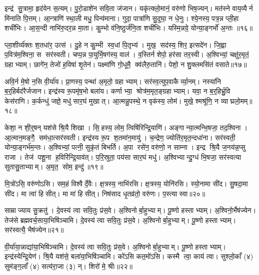 इन्द्र॑ सु॒त्रामा॒ हृद॑येन स॒त्यम्। पु॒रो॒डाशे॑न सवि॒ता ज॑जान। यकृ॑त्क्लो॒मानं॒ वरु॑णो भिष॒ज्यन्। मत॑स्ने वाय॒व्यैर्न मि॑नाति पि॒त्तम्। आ॒न्त्राणि॑ स्था॒ली मधु॒ पिन्व॑माना। गुदा॒ पात्रा॑णि सु॒दुघा॒ न धे॒नुः। श्ये॒नस्य॒ पत्र॒न्न प्ली॒हा शची॑भिः। आ॒स॒न्दी नाभि॑रु॒दर॒न्न मा॒ता। कु॒म्भो व॑नि॒ष्ठुर्ज॑नि॒ता शची॑भिः। यस्मि॒न्नग्रे॒ योन्या॒ङ्गर्भो॑ अ॒न्तः ॥१६॥

प्ला॒शीर्व्य॑क्तः श॒तधा॑र॒ उत्स॑। दु॒हे न कु॒म्भी स्व॒धां पि॒तृभ्य॑। मुख॒ सद॑स्य॒ शिर॒ इत्सदे॑न। जि॒ह्वा प॒वित्र॑म॒श्विना॒ स सर॑स्वती। चप्प॒न्न पा॒युर्भि॒षग॑स्य॒ वाल॑। व॒स्तिर्न शेपो॒ हर॑सा तर॒स्वी। अ॒श्विभ्यां॒ चक्षु॑र॒मृतं॒ ग्रहाभ्याम्। छागे॑न॒ तेजो॑ ह॒विषा॑ शृ॒तेन॑। पक्ष्मा॑णि गो॒धूमै॒ क्व॑लैरु॒तानि॑। पेशो॒ न शु॒क्लमसि॑तं वसाते॥१७॥

अवि॒र्न मे॒षो न॒सि वी॒र्या॑य। प्रा॒णस्य॒ पन्था॑ अ॒मृतो॒ ग्रहाभ्याम्। सर॑स्व॒त्युप॒वाकैर्व्या॒नम्। नस्या॑नि ब॒र्॒हिर्बद॑रैर्जजान। इन्द्र॑स्य रू॒पमृ॑ष॒भो बला॑य। कर्णाभ्या॒ श्रोत्र॑म॒मृत॒ङ्ग्रहाभ्याम्। यवा॒ न ब॒र्॒हिर्भ्रु॒वि केस॑राणि। क॒र्कन्धु॑ जज्ञे॒ मधु॑ सार॒घं मुखात्। आ॒त्मन्नु॒पस्थे॒ न वृक॑स्य॒ लोम॑। मुखे॒ श्मश्रू॑णि॒ न व्याघ्रलो॒मम्॥१८॥

केशा॒ न शी॒र्॒षन्‌ यश॑से श्रि॒यै शिखा। सि॒हस्य॒ लोम॒ त्विषि॑रिन्द्रि॒याणि॑। अङ्गान्या॒त्मन्भि॒षजा॒ तद॒श्विना। आ॒त्मान॒मङ्गै॒ सम॑धा॒त्सर॑स्वती। इन्द्र॑स्य रू॒प श॒तमा॑न॒मायु॑। च॒न्द्रेण॒ ज्योति॑र॒मृत॒न्दधा॑ना। सर॑स्वती॒ योन्या॒ङ्गर्भ॑म॒न्तः। अ॒श्विभ्यां॒ पत्नी॒ सुकृ॑तं बिभर्ति। अ॒पा रसे॑न॒ वरु॑णो॒ न साम्ना। इन्द्र श्रि॒यै ज॒नय॑न्न॒प्सु राजा। तेज॑ पशू॒ना ह॒विरि॑न्द्रि॒याव॑त्। प॒रि॒स्रुता॒ पय॑सा सार॒घं मधु॑। अ॒श्विभ्यान्दु॒ग्धं भि॒षजा॒ सर॑स्वत्या सुतासु॒ताभ्याम्। अ॒मृत॒ सोम॒ इन्दु॑॥१९॥\anuvakamend[अन्त॑र आ॒राद॒न्तर्व॑साते व्याघ्रलो॒म राजा॑ च॒त्वारि॑ च]

मि॒त्रो॑ऽसि॒ वरु॑णोऽसि। सम॒हं विश्वैर्दे॒वैः। क्ष॒त्रस्य॒ नाभि॑रसि। क्ष॒त्रस्य॒ योनि॑रसि। स्यो॒नामा सी॑द। सु॒षदा॒मा सी॑द। मा त्वा॑ हिसीत्। मा मा॑ हिसीत्। निष॑साद धृ॒तव्र॑तो॒ वरु॑णः। प॒स्त्यास्वा॥२०॥

साम्राज्याय सु॒क्रतु॑। दे॒वस्य॑ त्वा सवि॒तुः प्र॑स॒वे। अ॒श्विनोर्बा॒हुभ्याम्। पू॒ष्णो हस्ताभ्याम्। अ॒श्विनो॒र्भैष॑ज्येन। तेज॑से ब्रह्मवर्च॒साया॒भिषि॑ञ्चामि। दे॒वस्य॑ त्वा सवि॒तुः प्र॑स॒वे। अ॒श्विनोर्बा॒हुभ्याम्। पू॒ष्णो हस्ताभ्याम्। सर॑स्वत्यै॒ भैष॑ज्येन॥२१॥

वी॒र्या॑या॒न्नाद्या॑या॒भिषि॑ञ्चामि। दे॒वस्य॑ त्वा सवि॒तुः प्र॑स॒वे। अ॒श्विनोर्बा॒हुभ्याम्। पू॒ष्णो हस्ताभ्याम्। इन्द्र॑स्येन्द्रि॒येण॑। श्रि॒यै यश॑से॒ बला॑या॒भिषि॑ञ्चामि। को॑ऽसि कत॒मो॑ऽसि। कस्मै त्वा॒ काय॑ त्वा। सुश्लो॒काँ (४) सुम॑ङ्ग॒लाँ (४) सत्य॑रा॒जा (३) न्। शिरो॑ मे॒ श्रीः॥२२॥

